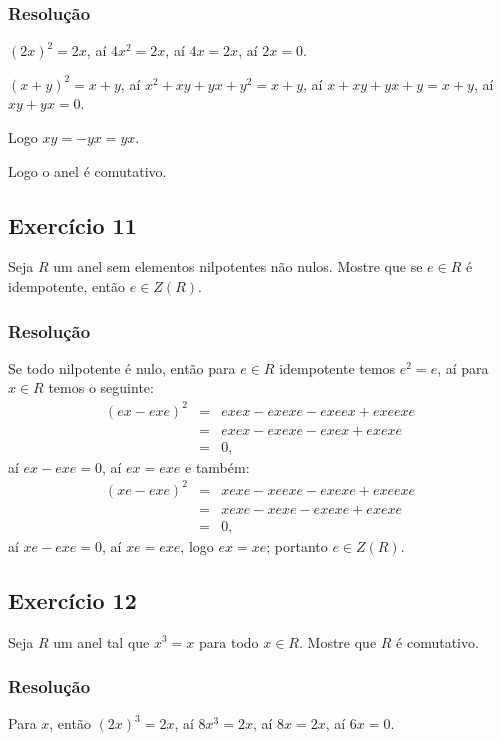 \documentclass[10pt,a4paper]{article}
\begin{document}
\subsubsection*{Resolução}

$(2x)^2=2x$, aí $4x^2=2x$, aí $4x=2x$, aí $2x=0$.

\medskip
\noindent
$(x+y)^2=x+y$, aí $x^2+xy+yx+y^2=x+y$, aí $x+xy+yx+y=x+y$, aí $xy+yx=0$.

\medskip
\noindent
Logo $xy=-yx=yx$.

\medskip
\noindent
Logo o anel é comutativo.

\subsection*{Exercício 11}

Seja $R$ um anel sem elementos nilpotentes não nulos. Mostre que se $e\in R$ é idempotente, então $e\in Z(R)$.

\subsubsection*{Resolução}

Se todo nilpotente é nulo, então para $e\in R$ idempotente temos $e^2=e$, aí para $x\in R$ temos o seguinte:
\[
\begin{array}{rcl}
(ex-exe)^2&=&exex-exexe-exeex+exeexe\\&=&exex-exexe-exex+exexe\\&=&0,
\end{array}
\]
aí $ex-exe=0$, aí $ex=exe$ e também:
\[
\begin{array}{rcl}
(xe-exe)^2&=&xexe-xeexe-exexe+exeexe\\&=&xexe-xexe-exexe+exexe\\&=&0,
\end{array}
\]
aí $xe-exe=0$, aí $xe=exe$, logo $ex=xe$; portanto $e\in Z(R)$.

\subsection*{Exercício 12}

Seja $R$ um anel tal que $x^3=x$ para todo $x\in R$. Mostre que $R$ é comutativo.

\subsubsection*{Resolução}

Para $x$, então $(2x)^3=2x$, aí $8x^3=2x$, aí $8x=2x$, aí $6x=0$.
\end{document}
